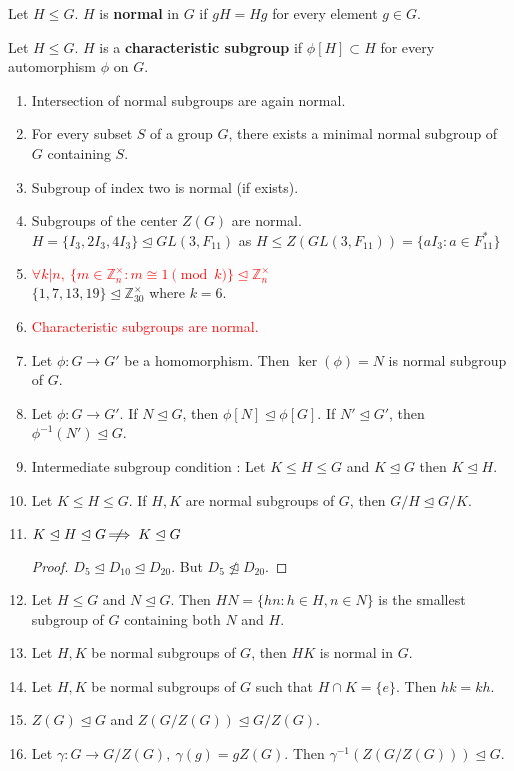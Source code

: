 \begin{definition}
	Let $H \le G$. $H$ is \textbf{normal} in $G$ if $gH = Hg$ for every element $g \in G$.
\end{definition}
\begin{definition}
	Let $H \le G$. $H$ is a \textbf{characteristic subgroup} if $\phi[H] \subset H$ for every automorphism $\phi$ on $G$.
\end{definition}
\begin{enumerate}
	\item Intersection of normal subgroups are again normal.
	\item For every subset $S$ of a group $G$, there exists a minimal normal subgroup of $G$ containing $S$.
	\item Subgroup of index two is normal (if exists).
	\item Subgroups of the center $Z(G)$ are normal.\\
		$H = \{ I_3,2I_3,4I_3 \} \trianglelefteq GL(3,F_{11})$ as $H \le Z(GL(3,F_{11})) = \{ aI_3 : a \in F^\ast_{11} \}$
	\item \textcolor{red}{$\forall k|n,\ \{ m \in \mathbb{Z}_n^\times : m \cong 1 \pmod{k} \} \trianglelefteq \mathbb{Z}_n^\times$}\\
		$\{ 1,7,13,19 \} \trianglelefteq \mathbb{Z}_{30}^\times$ where $k = 6$.
	\item \textcolor{red}{Characteristic subgroups are normal.}
	\item Let $\phi : G \to G'$ be a homomorphism. Then $\ker(\phi) = N$ is normal subgroup of $G$.
	\item Let $\phi : G \to G'$.  If $N \trianglelefteq G$, then $\phi[N] \trianglelefteq \phi[G]$.  If $N' \trianglelefteq G'$, then $\phi^{-1}(N') \trianglelefteq G$.
	\item Intermediate subgroup condition : Let $K \le H \le G$ and $K \trianglelefteq G$ then $K \trianglelefteq H$.
	\item Let $K \le H \le G$. If $H,K$ are normal subgroups of $G$, then $G/H \trianglelefteq G/K$.
	\item $K \trianglelefteq H \trianglelefteq G \;\not\nobreak\!\!\!\!\implies K \trianglelefteq G$
		\begin{proof}
			$D_5 \trianglelefteq D_{10} \trianglelefteq D_{20}$. But $D_5 \not\trianglelefteq D_{20}$.
		\end{proof}
	\item Let $H \le G$ and $N \trianglelefteq G$. Then $HN = \{ hn : h \in H, n \in N\}$ is the smallest subgroup of $G$ containing both $N$ and $H$.
	\item Let $H,K$ be normal subgroups of $G$, then $HK$ is normal in $G$.
	\item Let $H,K$ be normal subgroups of $G$ such that $H \cap K = \{ e \}$. Then $hk = kh$.
	\item $Z(G) \trianglelefteq G$ and $Z(G/Z(G)) \trianglelefteq G/Z(G)$.
	\item Let $\gamma : G \to G/Z(G),\ \gamma(g) = gZ(G)$. Then $\gamma^{-1}(Z(G/Z(G))) \trianglelefteq G$.
\end{enumerate}

